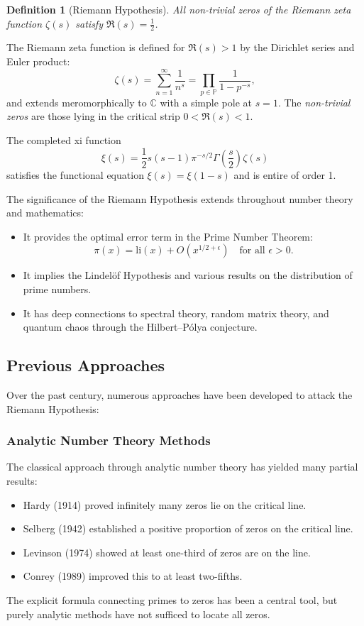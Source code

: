 \documentclass[11pt,hyp,]{nyjm}
\newtheorem{definition}[theorem]{Definition}
\begin{document}
\begin{definition}[Riemann Hypothesis]
All non-trivial zeros of the Riemann zeta function $\zeta(s)$ satisfy $\Re(s) = \tfrac12$.
\end{definition}

The Riemann zeta function is defined for $\Re(s) > 1$ by the Dirichlet series and Euler product:
\[
\zeta(s) = \sum_{n=1}^\infty \frac{1}{n^s} = \prod_{p \in \mathbb{P}} \frac{1}{1 - p^{-s}},
\]
and extends meromorphically to $\mathbb{C}$ with a simple pole at $s = 1$. The \emph{non-trivial zeros} are those lying in the critical strip $0 < \Re(s) < 1$.

The completed xi function
\[
\xi(s) = \frac{1}{2}s(s-1)\pi^{-s/2}\Gamma\left(\frac{s}{2}\right)\zeta(s)
\]
satisfies the functional equation $\xi(s) = \xi(1-s)$ and is entire of order 1.

The significance of the Riemann Hypothesis extends throughout number theory and mathematics:
\begin{itemize}
\item It provides the optimal error term in the Prime Number Theorem:
  \[
  \pi(x) = \mathrm{li}(x) + O(x^{1/2+\epsilon}) \quad \text{for all } \epsilon > 0.
  \]
\item It implies the Lindelöf Hypothesis and various results on the distribution of prime numbers.
\item It has deep connections to spectral theory, random matrix theory, and quantum chaos through the Hilbert–Pólya conjecture.
\end{itemize}

\subsection{Previous Approaches}

Over the past century, numerous approaches have been developed to attack the Riemann Hypothesis:

\subsubsection{Analytic Number Theory Methods}
The classical approach through analytic number theory has yielded many partial results:
\begin{itemize}
\item Hardy (1914) proved infinitely many zeros lie on the critical line.
\item Selberg (1942) established a positive proportion of zeros on the critical line.
\item Levinson (1974) showed at least one-third of zeros are on the line.
\item Conrey (1989) improved this to at least two-fifths.
\end{itemize}
The explicit formula connecting primes to zeros has been a central tool, but purely analytic methods have not sufficed to locate all zeros.
\end{document}

